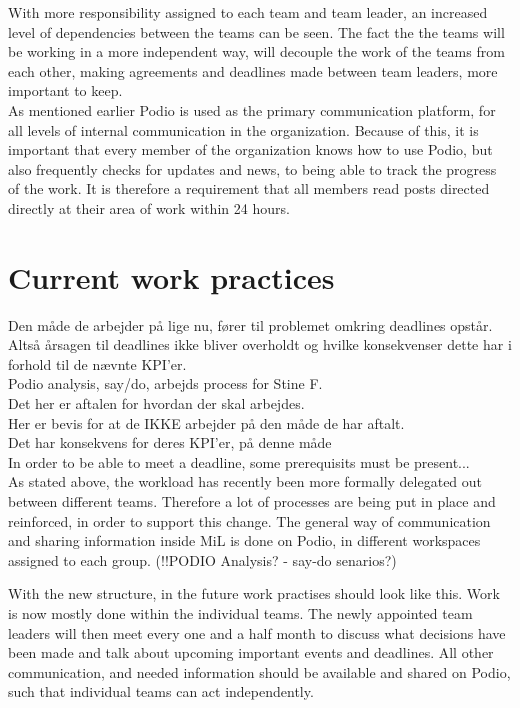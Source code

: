 With more responsibility assigned to each team and team leader, an increased level of dependencies between the teams can be seen. The fact the the teams will be working in a more independent way, will decouple the work of the teams from each other, making agreements and deadlines made between team leaders, more important to keep.\\

As mentioned earlier Podio is used as the primary communication platform, for all levels of internal communication in the organization. Because of this, it is important that every member of the organization knows how to use Podio, but also frequently checks for updates and news, to being able to track the progress of the work. It is therefore a requirement that all members read posts directed directly at their area of work within 24 hours. 
\section{Current work practices}
Den måde de arbejder på lige nu, fører til problemet omkring deadlines opstår. Altså årsagen til deadlines ikke bliver overholdt og hvilke konsekvenser dette har i forhold til de nævnte KPI'er. \\
Podio analysis, say/do, arbejds process for Stine F.\\
Det her er aftalen for hvordan der skal arbejdes.\\
Her er bevis for at de IKKE arbejder på den måde de har aftalt.\\
Det har konsekvens for deres KPI'er, på denne måde\\

In order to be able to meet a deadline, some prerequisits must be present...\\


As stated above, the workload has recently been more formally delegated out between different teams. Therefore a lot of processes are being put in place and reinforced, in order to support this change. The general way of communication and sharing information inside MiL is done on Podio, in different workspaces assigned to each group. (!!PODIO Analysis? - say-do senarios?) \

With the new structure, in the future work practises should look like this. Work is now mostly done within the individual teams. The newly appointed team leaders will then meet every one and a half month to discuss what decisions have been made and talk about upcoming important events and deadlines. All other communication, and needed information should be available and shared on Podio, such that individual teams can act independently.\\

